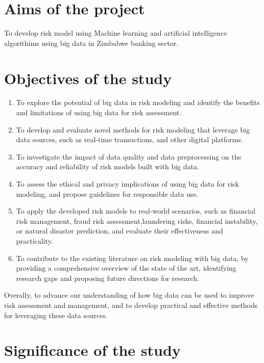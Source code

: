 \section{Aims of the project}

To develop risk model using Machine learning and artificial intelligence algorithims using big data in Zimbabwe banking sector.

\section{Objectives of the study}
\begin{enumerate}
    \item To explore the potential of big data in risk modeling and identify the benefits and limitations of using big data for risk assessment.
    \item To develop and evaluate novel methods for risk modeling that leverage big data sources, such as real-time transactions, and other digital platforms.
    \item To investigate the impact of data quality and data preprocessing on the accuracy and reliability of risk models built with big data.
    \item To assess the ethical and privacy implications of using big data for risk modeling, and propose guidelines for responsible data use.
    \item To apply the developed risk models to real-world scenarios, such as financial risk management, fraud risk assessment,laundering risks, financial instability, or natural disaster prediction, and evaluate their effectiveness and practicality.
    \item To contribute to the existing literature on risk modeling with big data, by providing a comprehensive overview of the state of the art, identifying research gaps and proposing future directions for research.
\end{enumerate}

Overally, to advance our understanding of how big data can be used to improve risk assessment
and management, and to develop practical and effective methods for leveraging these data
sources.\par

\section{Significance of the study}

